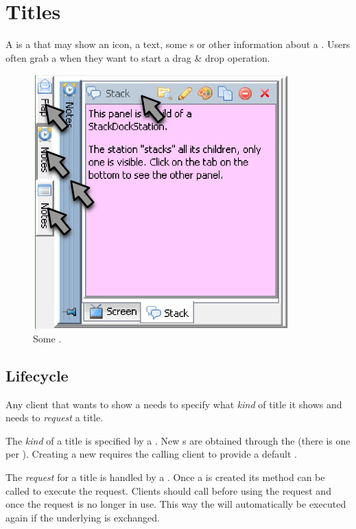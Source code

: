 \section{Titles} \label{sec:titles}
A  is a  that may show an icon, a text, some s or other information about a . Users often grab a  when they want to start a drag \& drop operation.

\begin{figure}[h]
\centering
\includegraphics[scale=0.5]{titles/titles}
\caption{Some .}
\label{fig:titles}
\end{figure}

\subsection{Lifecycle}
Any client that wants to show a  needs to specify what \textit{kind} of title it shows and needs to \textit{request} a title.

The \textit{kind} of a title is specified by a . New \linebreak {}s are obtained through the  (there is one per ). Creating a new  requires the calling client to provide a default .

The \textit{request} for a title is handled by a . Once a \linebreak {} is created its method  can be called to execute the request. Clients should call  before using the request and  once the request is no longer in use. This way the  will automatically be executed again if the underlying  is exchanged.

